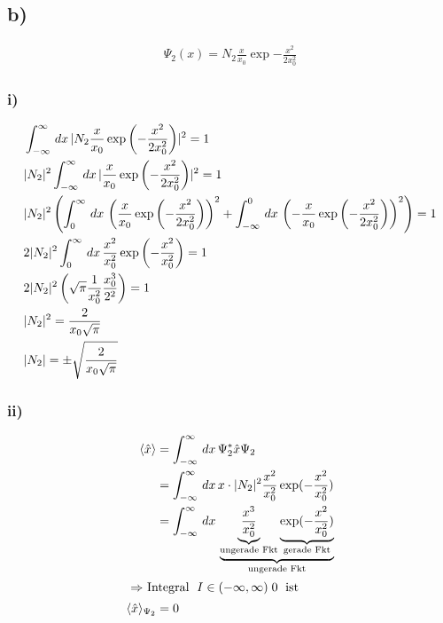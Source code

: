\subsection{b)}

\begin{align}
    \Psi_2 (x)=N_2 \frac{x}{x_0} \exp{-\frac{x^2}{2x_0^2}}
\end{align}

\subsubsection{i)}

\begin{align}
    &\int_{-\infty}^{\infty}\,dx\, \lvert N_2\frac{x}{x_0}\exp\left(-\frac{x^2}{2x_0^2}\right)\rvert^2=1\\
    &\lvert N_2\rvert^2 \int_{-\infty}^{\infty}\,dx\, \lvert\frac{x}{x_0}\exp\left(-\frac{x^2}{2x_0^2}\right)\rvert^2=1 \nonumber\\
    &\lvert N_2\rvert^2 \left(\int_0^{\infty}\,dx\,\left(\frac{x}{x_0}\exp\left(-\frac{x^2}{2x_0^2}\right)\right)^2+ \int_{-\infty}^0\,dx\,\left(-\frac{x}{x_0} \exp\left(-\frac{x^2}{2x_0^2}\right)\right)^2 \right)=1 \nonumber\\
    &2 \lvert N_2\rvert^2 \int_0^{\infty}\,dx\, \frac{x^2}{x_0^2} \exp\left(-\frac{x^2}{x_0^2}\right)=1 \nonumber\\
    &2 \lvert N_2\rvert^2 \left(\sqrt{\pi} \frac{1}{x_0^2} \frac{x_0^3}{2^2}\right)=1 \nonumber\\
    &\lvert N_2\rvert^2=\frac{2}{x_0\sqrt{\pi}} \nonumber\\
    &\lvert N_2\rvert= \pm \sqrt{\frac{2}{x_0\sqrt{\pi}}}
\end{align}

\subsubsection{ii)}

\begin{align}
    \langle\hat x \rangle &= \int_{-\infty}^{\infty}\,dx\, \Psi _2^* \hat x \Psi _2\\
    &= \int_{-\infty}^{\infty}\,dx\, x\cdot  \lvert N_2\rvert^2 \frac{x^2}{x_0^2}\exp(-\frac{x^2}{x_0^2}) \nonumber\\
    &=\int_{-\infty}^{\infty}\,dx\, \underbrace{\underbrace{\frac{x^3}{x_0^2}}_{\text{ungerade Fkt}} \underbrace{\exp(-\frac{x^2}{x_0^2})}_{\text{gerade Fkt}}}_{\text{ungerade Fkt}} \nonumber\\
    \intertext{
        $\Rightarrow $ Integral $\;I \in (-\infty,\infty) \; 0\; $ ist
    }
    \langle\hat x \rangle_{\Psi_2}&=0
\end{align}

